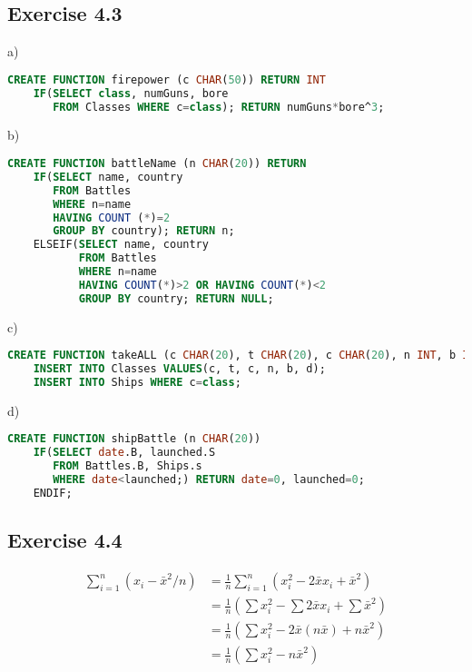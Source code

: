 \documentclass[../../main.tex]{subfiles}
\begin{document}
\subsection*{Exercise 4.3}

a)

\begin{lstlisting}[language=sql]
  CREATE FUNCTION firepower (c CHAR(50)) RETURN INT
    IF(SELECT class, numGuns, bore
       FROM Classes WHERE c=class); RETURN numGuns*bore^3;
\end{lstlisting}

b)

\begin{lstlisting}[language=sql]
  CREATE FUNCTION battleName (n CHAR(20)) RETURN
    IF(SELECT name, country
       FROM Battles
       WHERE n=name
       HAVING COUNT (*)=2
       GROUP BY country); RETURN n;
    ELSEIF(SELECT name, country
           FROM Battles
           WHERE n=name
           HAVING COUNT(*)>2 OR HAVING COUNT(*)<2
           GROUP BY country; RETURN NULL;
\end{lstlisting}

c)

\begin{lstlisting}[language=sql]
  CREATE FUNCTION takeALL (c CHAR(20), t CHAR(20), c CHAR(20), n INT, b INT, d INT)
    INSERT INTO Classes VALUES(c, t, c, n, b, d);
    INSERT INTO Ships WHERE c=class;
\end{lstlisting}

d)

\begin{lstlisting}[language=sql]
  CREATE FUNCTION shipBattle (n CHAR(20))
    IF(SELECT date.B, launched.S
       FROM Battles.B, Ships.s
       WHERE date<launched;) RETURN date=0, launched=0;
    ENDIF;
\end{lstlisting}

\subsection*{Exercise 4.4}

\begin{align*}
  \sum_{i = 1}^{n}(x_{i} - \bar{x}^{2} / n)&=
    \frac{1}{n}\sum_{i = 1}^{n}(x_{i}^{2} - 2\bar{x}x_{i} + \bar{x}^{2}) \\
  &= \frac{1}{n}\left(\sum x_{i}^{2} - \sum 2\bar{x}x_{i} + \sum \bar{x}^{2}\right) \\
  &= \frac{1}{n}\left(\sum x_{i}^{2} - 2\bar{x}(n\bar{x}) + n\bar{x}^{2}\right) \\
  &= \frac{1}{n}\left(\sum x_{i}^{2} - n\bar{x}^{2}\right) \\
\end{align*}
\end{document}

